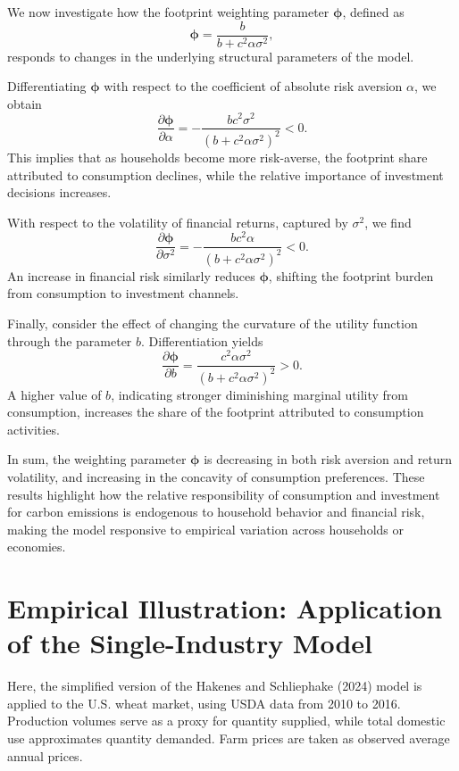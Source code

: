 \documentclass[12pt,a4paper]{article}%
\begin{document}
We now investigate how the footprint weighting parameter \( \boldsymbol{\phi} \), defined as
\[
\boldsymbol{\phi} = \frac{b}{b + c^2 \alpha \sigma^2},
\]
responds to changes in the underlying structural parameters of the model.

Differentiating \( \boldsymbol{\phi} \) with respect to the coefficient of absolute risk aversion \( \alpha \), we obtain
\[
\frac{\partial \boldsymbol{\phi}}{\partial \alpha} = -\frac{b c^2 \sigma^2}{{(b + c^2 \alpha \sigma^2)}^2} < 0.
\]
This implies that as households become more risk-averse, the footprint share attributed to consumption declines, while the relative importance of investment decisions increases.

With respect to the volatility of financial returns, captured by \( \sigma^2 \), we find
\[
\frac{\partial \boldsymbol{\phi}}{\partial \sigma^2} = -\frac{b c^2 \alpha}{{(b + c^2 \alpha \sigma^2)}^2} < 0.
\]
An increase in financial risk similarly reduces \( \boldsymbol{\phi} \), shifting the footprint burden from consumption to investment channels.

Finally, consider the effect of changing the curvature of the utility function through the parameter \( b \). Differentiation yields
\[
\frac{\partial \boldsymbol{\phi}}{\partial b} = \frac{c^2 \alpha \sigma^2}{{(b + c^2 \alpha \sigma^2)}^2} > 0.
\]
A higher value of \( b \), indicating stronger diminishing marginal utility from consumption, increases the share of the footprint attributed to consumption activities.

In sum, the weighting parameter \( \boldsymbol{\phi} \) is decreasing in both risk aversion and return volatility, and increasing in the concavity of consumption preferences. These results highlight how the relative responsibility of consumption and investment for carbon emissions is endogenous to household behavior and financial risk, making the model responsive to empirical variation across households or economies.

\section{Empirical Illustration: Application of the Single-Industry Model}

Here, the simplified version of the Hakenes and Schliephake (2024) model is applied to the U.S. wheat market, using USDA data from 2010 to 2016. Production volumes serve as a proxy for quantity supplied, while total domestic use approximates quantity demanded. Farm prices are taken as observed average annual prices.
\end{document}
